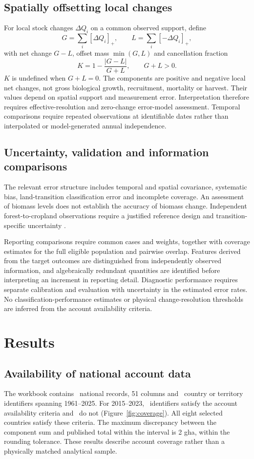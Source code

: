 \documentclass[11pt,a4paper]{article}
\begin{document}
\subsection{Spatially offsetting local changes}
For local stock changes $\Delta Q_i$ on a common observed support, define
\[
G=\sum_i[\Delta Q_i]_+,\qquad L=\sum_i[-\Delta Q_i]_+,
\]
with net change $G-L$, offset mass $\min(G,L)$ and cancellation fraction
\begin{equation}
K=1-\frac{|G-L|}{G+L},\qquad G+L>0.\label{eq:cancel}
\end{equation}
$K$ is undefined when $G+L=0$. The components are positive and negative local net changes, not gross biological growth, recruitment, mortality or harvest. Their values depend on spatial support and measurement error. Interpretation therefore requires effective-resolution and zero-change error-model assessment. Temporal comparisons require repeated observations at identifiable dates rather than interpolated or model-generated annual independence.

\subsection{Uncertainty, validation and information comparisons}
The relevant error structure includes temporal and spatial covariance, systematic bias, land-transition classification error and incomplete coverage. An assessment of biomass levels does not establish the accuracy of biomass change. Independent forest-to-cropland observations require a justified reference design and transition-specific uncertainty \citep{Olofsson2014}.

Reporting comparisons require common cases and weights, together with coverage estimates for the full eligible population and pairwise overlap. Features derived from the target outcomes are distinguished from independently observed information, and algebraically redundant quantities are identified before interpreting an increment in reporting detail. Diagnostic performance requires separate calibration and evaluation with uncertainty in the estimated error rates. No classification-performance estimates or physical change-resolution thresholds are inferred from the account availability criteria.

\section{Results}
\subsection{Availability of national account data}
The workbook contains \NationalRows\ national records, 51 columns and \CountryIDs\ country or territory identifiers spanning 1961--2025. For 2015--2023, \AccountPass\ identifiers satisfy the account availability criteria and \AccountFail\ do not (Figure~\ref{fig:coverage}). All eight selected countries satisfy these criteria. The maximum discrepancy between the component sum and published total within the interval is 2 gha, within the rounding tolerance. These results describe account coverage rather than a physically matched analytical sample.
\end{document}
